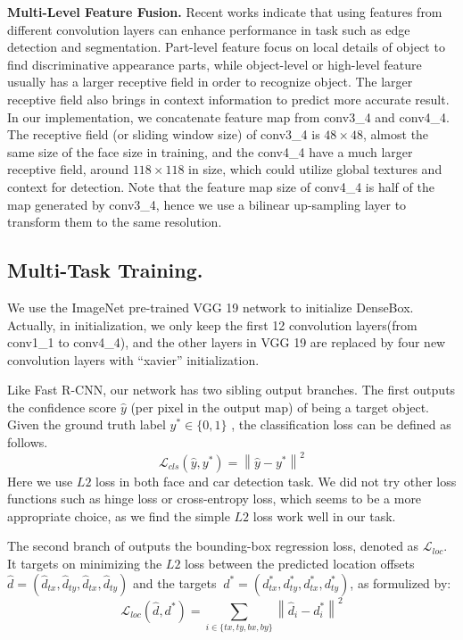 \textbf{Multi-Level Feature Fusion.} 
Recent works\cite{bertasius2014deepedge, liu2015parsenet} indicate that using features from different convolution layers can enhance performance in task such as edge detection and segmentation. Part-level feature focus on local details of object to find discriminative appearance parts, while object-level or high-level feature usually has a larger receptive field in order to recognize object. The larger receptive field also brings in context information to predict more accurate result. In our implementation, we concatenate feature map from conv3\_4 and conv4\_4. The receptive field (or sliding window size) of conv3\_4 is $48 \times 48$, almost the same size of the face size in training, and the conv4\_4 have a much larger receptive field, around $118 \times 118$ in size, which could utilize global textures and context for detection.  Note that the feature map size of conv4\_4 is half of the map generated by conv3\_4, hence we use a bilinear up-sampling layer to transform them to the same resolution. 

\subsection{Multi-Task Training.} 
\label{sec:training} 
We use the ImageNet pre-trained VGG 19 network to initialize DenseBox. Actually, in initialization, we only keep the first 12 convolution layers(from conv1\_1 to conv4\_4), and the other layers in VGG 19 are replaced by four new convolution layers with “xavier” initialization. 

Like Fast R-CNN, our network has two sibling output branches.  The first outputs the confidence score $ \hat{y}$ (per pixel in the output map) of being a target object.  Given the ground truth label $y^* \in \{0,1 \}$ , the classification loss can be defined as follows. 
	\begin{equation}\label{eq:eq_cls_loss}
	\mathcal{L} _{cls}(\hat{y},y^*) = \left \| \hat{y} - y^* \right \| ^2
	\end{equation}
Here we use $L2$ loss in both face and car detection task. We did not try other loss functions such as hinge loss or cross-entropy loss, which seems to be a more appropriate choice, as we find the simple $L2$ loss work well in our task. 

The second branch of outputs the bounding-box regression loss, denoted as $\mathcal{L} _{loc}$.  It targets on minimizing the $L2$ loss between the predicted location offsets $\hat{d} = (\hat{d}_{tx}, \hat{d}_{ty}, \hat{d}_{tx}, \hat{d}_{ty})$ and the targets  $\ d^* = (d^{*}_{tx},  d^{*}_{ty},  d^{*}_{tx}, d^{*}_{ty})$, as formulized by:
	\begin{equation}\label{eq:eq_loc_loss}
	\mathcal{L} _{loc}(\hat{d},d^*) =  \sum_{i \in \{ tx, ty,bx,by \} }  \left \| \hat{d}_{i} - d^*_{i} \right \| ^2
	\end{equation}

